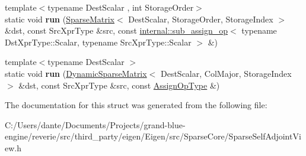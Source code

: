 \begin{DoxyCompactItemize}
\item 
\mbox{\label{struct_eigen_1_1internal_1_1_assignment_3_01_dst_xpr_type_00_01_src_xpr_type_00_01_functor_00_017b35cf78061a31c93b838bddfa619fa3_ae387083532d1a0e38c4b8f2427610c9b}} 
{\footnotesize template$<$typename Dest\+Scalar , int Storage\+Order$>$ }\\static void {\bfseries run} (\mbox{\hyperlink{class_eigen_1_1_sparse_matrix}{Sparse\+Matrix}}$<$ Dest\+Scalar, Storage\+Order, Storage\+Index $>$ \&dst, const Src\+Xpr\+Type \&src, const \mbox{\hyperlink{struct_eigen_1_1internal_1_1sub__assign__op}{internal\+::sub\+\_\+assign\+\_\+op}}$<$ typename Dst\+Xpr\+Type\+::\+Scalar, typename Src\+Xpr\+Type\+::\+Scalar $>$ \&)
\item 
\mbox{\label{struct_eigen_1_1internal_1_1_assignment_3_01_dst_xpr_type_00_01_src_xpr_type_00_01_functor_00_017b35cf78061a31c93b838bddfa619fa3_aa06877715605088e5832b54bf5a23ea1}} 
{\footnotesize template$<$typename Dest\+Scalar $>$ }\\static void {\bfseries run} (\mbox{\hyperlink{class_eigen_1_1_dynamic_sparse_matrix}{Dynamic\+Sparse\+Matrix}}$<$ Dest\+Scalar, Col\+Major, Storage\+Index $>$ \&dst, const Src\+Xpr\+Type \&src, const \mbox{\hyperlink{struct_eigen_1_1internal_1_1assign__op}{Assign\+Op\+Type}} \&)
\end{DoxyCompactItemize}


The documentation for this struct was generated from the following file\+:\begin{DoxyCompactItemize}
\item 
C\+:/\+Users/dante/\+Documents/\+Projects/grand-\/blue-\/engine/reverie/src/third\+\_\+party/eigen/\+Eigen/src/\+Sparse\+Core/Sparse\+Self\+Adjoint\+View.\+h\end{DoxyCompactItemize}
